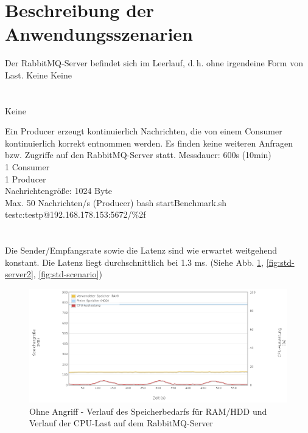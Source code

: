 \documentclass[	a4paper,
			11pt,
			oneside,
			parskip]{scrartcl}
\begin{document}
	
	
\clearpage
\section*{Beschreibung der Anwendungsszenarien}
		{Der RabbitMQ-Server befindet sich im Leerlauf, d.\,h. ohne irgendeine Form von Last.}%
		{Keine}%
		{Keine}%
		{%
		 \\
		 \\
		 \\
		}%
		{Keine}
	
		{Ein Producer erzeugt kontinuierlich Nachrichten, die von einem Consumer kontinuierlich korrekt entnommen werden. Es finden keine weiteren Anfragen bzw. Zugriffe auf den RabbitMQ-Server statt.}%
		{%
		 Messdauer: 600s (10min)\\
		 1 Consumer \\
		 1 Producer \\
		 Nachrichtengröße: 1024 Byte\\
		 Max. 50 Nachrichten/s (Producer)
		}%
		{bash startBenchmark.sh testc:testp@192.168.178.153:5672/\%2f}%
		{%
		 \\
		 \\
		 \\
		}%
		{
		 Die Sender/Empfangsrate sowie die Latenz sind wie erwartet weitgehend konstant. Die Latenz liegt durchschnittlich bei 1.3 ms.
		 (Siehe Abb. \ref{fig:std-server1}, \ref{fig:std-server2}, \ref{fig:std-scenario})
		}
		
		\begin{figure}[!htb]
			\centering
			\includegraphics[width=\textwidth]{img/std/std_server1.png}
			\caption{Ohne Angriff - Verlauf des Speicherbedarfs für RAM/HDD und Verlauf der CPU-Last auf dem RabbitMQ-Server}
			\label{fig:std-server1}
		\end{figure}
		
\end{document}
